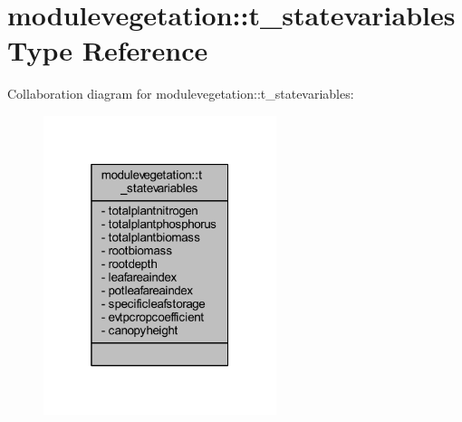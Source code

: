 \hypertarget{structmodulevegetation_1_1t__statevariables}{}\section{modulevegetation\+:\+:t\+\_\+statevariables Type Reference}
\label{structmodulevegetation_1_1t__statevariables}


Collaboration diagram for modulevegetation\+:\+:t\+\_\+statevariables\+:\nopagebreak
\begin{figure}[H]
\begin{center}
\leavevmode
\includegraphics[width=193pt]{structmodulevegetation_1_1t__statevariables__coll__graph}
\end{center}
\end{figure}

